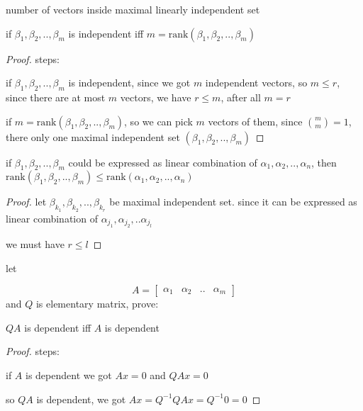 \begin{definition}[rank]
    number of vectors inside maximal linearly independent set
\end{definition}

\begin{exercise}
    if $\beta_1, \beta_2, .., \beta_m$ is independent iff $m = \mathrm{rank}(\beta_1, \beta_2, .., \beta_m)$
\end{exercise}

\begin{proof}
steps:

    if $\beta_1, \beta_2, .., \beta_m$ is independent, since we got $m$ independent vectors,
    so $m \le r$, since there are at most $m$ vectors, we have $r \le m$, after all $m = r$

    if $m = \mathrm{rank}(\beta_1, \beta_2, .., \beta_m)$, so we can pick $m$ vectors of them, 
    since $\binom{m}{m} = 1$, there only one maximal independent set $(\beta_1, \beta_2, .., \beta_m)$
\end{proof}

\begin{exercise}
    if $\beta_1, \beta_2, .., \beta_m$ could be expressed as linear combination of
    $\alpha_1, \alpha_2, .., \alpha_n$, then $\mathrm{rank}(\beta_1, \beta_2, .., \beta_m) \le \mathrm{rank}(\alpha_1, \alpha_2, .., \alpha_n)$

\end{exercise}

\begin{proof}
    let $\beta_{k_1}, \beta_{k_2}, .., \beta_{k_r}$ be maximal independent set. since it can be expressed 
    as linear combination of $\alpha_{j_1}, \alpha_{j_2}, .. \alpha_{j_l}$

    we must have $r \le l$
\end{proof}


\begin{exercise}
    let 

    \[
    A = \begin{bmatrix}
        \alpha_1 & \alpha_2 & .. & \alpha_m
    \end{bmatrix}
    \]
    and $Q$ is elementary matrix, prove:

    $QA$ is dependent iff $A$ is dependent

\end{exercise}

\begin{proof}
    steps:

    if $A$ is dependent we got $Ax = 0$ and $QAx = 0$

    so $QA$ is dependent, we got $Ax = Q^{-1}QAx = Q^{-1}0 = 0$
\end{proof}

